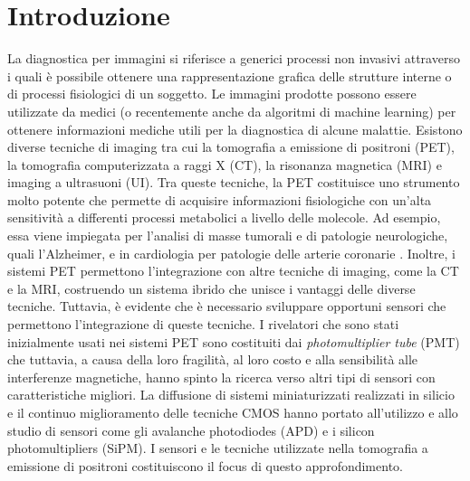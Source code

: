 \chapter*{Introduzione}
La diagnostica per immagini si riferisce a generici processi non invasivi attraverso i quali è possibile ottenere una rappresentazione grafica delle strutture interne o di processi fisiologici di un soggetto. Le immagini prodotte possono essere utilizzate da medici (o recentemente anche da algoritmi di machine learning) per ottenere informazioni mediche utili per la diagnostica di alcune malattie. Esistono diverse tecniche di imaging tra cui la tomografia a emissione di positroni (PET), la tomografia computerizzata a raggi X (CT), la risonanza magnetica (MRI) e imaging a ultrasuoni (UI). Tra queste tecniche, la PET costituisce uno strumento molto potente che permette di acquisire informazioni fisiologiche con un'alta sensitività a differenti processi metabolici a livello delle molecole. Ad esempio, essa viene impiegata per l'analisi di masse tumorali e di patologie neurologiche, quali l'Alzheimer, e in cardiologia per patologie delle arterie coronarie \cite{Jiang2019}. Inoltre, i sistemi PET permettono l'integrazione con altre tecniche di imaging, come la CT e la MRI, costruendo un sistema ibrido che unisce i vantaggi delle diverse tecniche. Tuttavia, è evidente che è necessario sviluppare opportuni sensori che permettono l'integrazione di queste tecniche. I rivelatori che sono stati inizialmente usati nei sistemi PET sono costituiti dai \textit{photomultiplier tube} (PMT) che tuttavia, a causa della loro fragilità, al loro costo e alla sensibilità alle interferenze magnetiche, hanno spinto la ricerca verso altri tipi di sensori con caratteristiche migliori. La diffusione di sistemi miniaturizzati realizzati in silicio e il continuo miglioramento delle tecniche CMOS hanno portato all'utilizzo e allo studio di sensori come gli avalanche photodiodes (APD) e i silicon photomultipliers (SiPM). I sensori e le tecniche utilizzate nella tomografia a emissione di positroni costituiscono il focus di questo approfondimento.